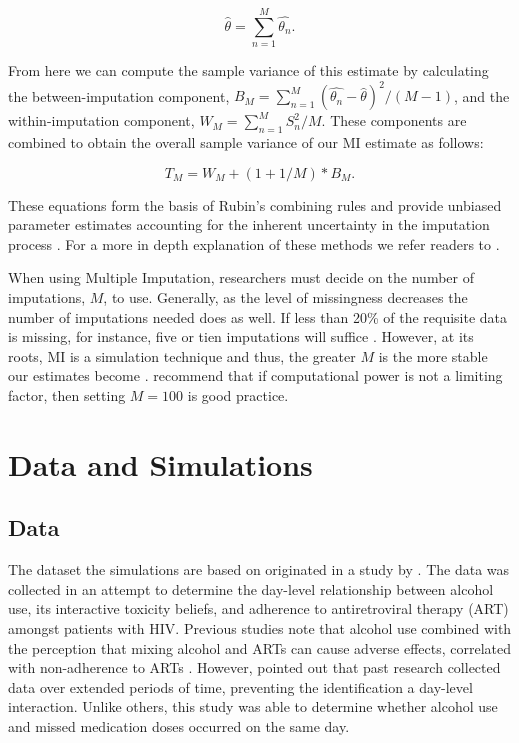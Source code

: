 \documentclass{svjour3}                     %
\begin{document}
\begin{equation}
\widehat{\theta} = \sum_{n=1}^{M} \widehat{\theta_n}.
\end{equation}

From here we can compute the sample variance of this estimate by calculating the between-imputation component, $B_M = \sum_{n=1}^{M} (\widehat{\theta_n} - \widehat{\theta})^2 / (M-1)$, and the within-imputation component, $W_M = \sum_{n=1}^{M} S_n^2 / M$. These components are combined to obtain the overall sample variance of our MI estimate as follows:

\begin{equation}
T_M = W_M + (1+1/M)*B_M.
\end{equation}

These equations form the basis of Rubin's combining rules and provide unbiased parameter estimates accounting for the inherent uncertainty in the imputation process \citep{raghunathan2015missing}. For a more in depth explanation of these methods we refer readers to \citet{little2014statistical}. \par

When using Multiple Imputation, researchers must decide on the number of imputations, $M$, to use. Generally, as the level of missingness decreases the number of imputations needed does as well. If less than 20\% of the requisite data is missing, for instance, five or tien imputations will suffice \citep{raghunathan2015missing}. However, at its roots, MI is a simulation technique and thus, the greater $M$ is the more stable our estimates become \citep{harel2007inferences}. \citet{graham2007many} recommend that if computational power is not a limiting factor, then setting $M=100$ is good practice. \par


\section{Data and Simulations}
\label{sec:2}
\subsection{Data}
\label{sec:2.1}
The dataset the simulations are based on originated in a study by \citet{pellowski2016alcohol}. The data was collected in an attempt to determine the day-level relationship between alcohol use, its interactive toxicity beliefs, and adherence to antiretroviral therapy (ART) amongst patients with HIV. Previous studies note that alcohol use combined with the perception that mixing alcohol and ARTs can cause adverse effects, correlated with non-adherence to ARTs \citep{kalichman2009prevalence, kalichman2012alcohol}. However, \citet{pellowski2016alcohol} pointed out that past research collected data over extended periods of time, preventing the identification a day-level interaction. Unlike others, this study was able to determine whether alcohol use and missed medication doses occurred on the same day. \par
\end{document}
